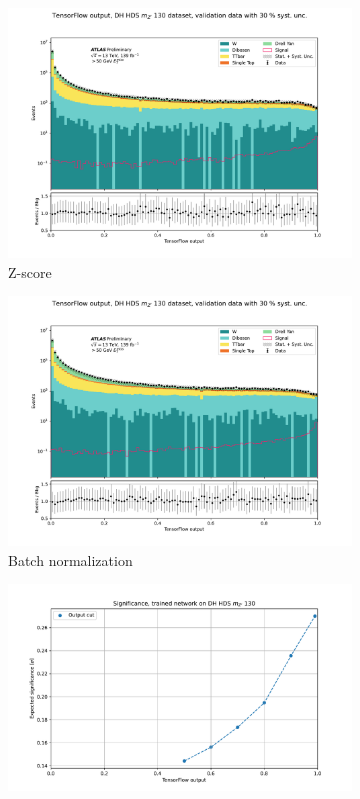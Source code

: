 \documentclass[14pt, a4paper]{book}
\begin{document}
\begin{figure}[!ht]
	\centering
	\begin{subfigure}[b]{0.49\textwidth}
      \centering
      \includegraphics[width=1\textwidth]{Z_score/VAL.pdf}
      \caption{Z-score}
   \end{subfigure}
   \hfill
   \begin{subfigure}[b]{0.49\textwidth}
      \centering
      \includegraphics[width=1\textwidth]{Batch_norm/VAL.pdf}
      \caption{Batch normalization}
   \end{subfigure}
   \hfill
   \begin{subfigure}[b]{0.49\textwidth}
      \centering
      \includegraphics[width=1\textwidth]{Z_score/EXP_SIG.pdf}

\end{subfigure}
\end{figure}
\end{document}
